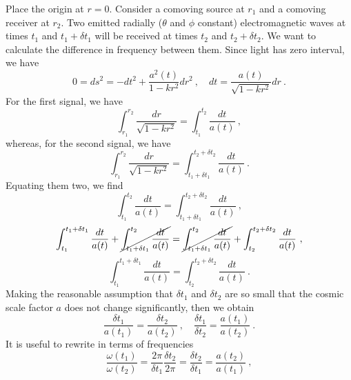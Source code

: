     Place the origin at $r=0$. Consider a comoving source at $r_1$ and a comoving receiver at $r_2$. Two emitted radially ($\theta$ and $\phi$ constant) electromagnetic waves at times $t_1$ and $t_1 + \delta t_1$ will be received at times $t_2$ and $t_2 + \delta t_2$. We want to calculate the difference in frequency between them. Since light has zero interval, we have 
    \begin{equation*}
        0 = ds^2 = - dt^2 + \frac{a^2(t)}{1 - kr^2} dr^2 ~, \quad dt = \frac{a(t)}{\sqrt{1 - kr^2}} dr ~.
    \end{equation*}
    For the first signal, we have 
    \begin{equation*}
        \int_{r_1}^{r_2} \frac{dr}{\sqrt{1 - k r^2}} = \int_{t_1}^{t_2} \frac{d t}{a(t)} ~,
    \end{equation*}
    whereas, for the second signal, we have
    \begin{equation*}
        \int_{r_1}^{r_2} \frac{dr}{\sqrt{1 - k r^2}} = \int_{t_1 + \delta t_1}^{t_2 + \delta t_2} \frac{dt}{a(t)} ~.
    \end{equation*}
    Equating them two, we find 
    \begin{equation*}
        \int_{t_1}^{t_2} \frac{d t}{a(t)} = \int_{t_1 + \delta t_1}^{t_2 + \delta t_2} \frac{dt}{a(t)} ~,
    \end{equation*}
    \begin{equation*}
        \int_{t_1}^{t_1 + \delta t_1} \frac{d t}{a(t)} + \cancel{\int^{t_2}_{t_1 + \delta t_1} \frac{d t}{a(t)}} = \cancel{\int_{t_1 + \delta t_1}^{t_2} \frac{dt}{a(t)}} + \int_{t_2}^{t_2 + \delta t_2} \frac{dt}{a(t)} ~,
    \end{equation*}
    \begin{equation*}
        \int_{t_1}^{t_1 + \delta t_1} \frac{d t}{a(t)} = \int_{t_2}^{t_2 + \delta t_2} \frac{dt}{a(t)} ~.
    \end{equation*}
    Making the reasonable assumption that $\delta t_1$ and $\delta t_2$ are so small that the cosmic scale factor $a$ does not change significantly, then we obtain
    \begin{equation*}
        \frac{\delta t_1}{a(t_1)} = \frac{\delta t_2}{a(t_2)} ~, \quad \frac{\delta t_1}{\delta t_2} = \frac{a(t_1)}{a(t_2)} ~.
    \end{equation*}
    It is useful to rewrite in terms of frequencies
    \begin{equation*}
        \frac{\omega(t_1)}{\omega(t_2)} = \frac{2\pi}{\delta t_1} \frac{\delta t_2}{2\pi} = \frac{\delta t_2}{\delta t_1} = \frac{a(t_2)}{a(t_1)} ~,
    \end{equation*}
